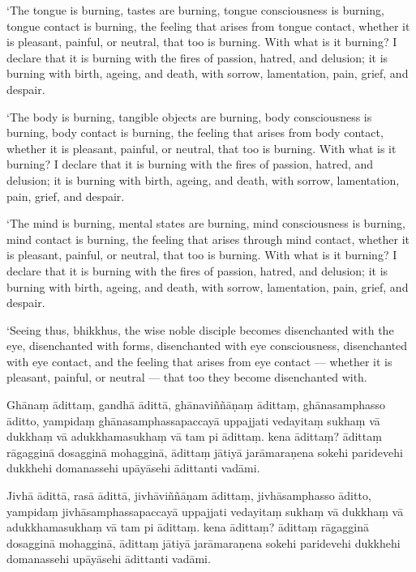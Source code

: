 ‘The tongue is burning, tastes are burning, tongue consciousness is
burning, tongue contact is burning, the feeling that arises from tongue
contact, whether it is pleasant, painful, or neutral, that too is
burning. With what is it burning? I declare that it is burning with the
fires of passion, hatred, and delusion; it is burning with birth,
ageing, and death, with sorrow, lamentation, pain, grief, and despair.

‘The body is burning, tangible objects are burning, body consciousness
is burning, body contact is burning, the feeling that arises from body
contact, whether it is pleasant, painful, or neutral, that too is
burning. With what is it burning? I declare that it is burning with the
fires of passion, hatred, and delusion; it is burning with birth,
ageing, and death, with sorrow, lamentation, pain, grief, and despair.

‘The mind is burning, mental states are burning, mind consciousness is
burning, mind contact is burning, the feeling that arises through mind
contact, whether it is pleasant, painful, or neutral, that too is
burning. With what is it burning? I declare that it is burning with the
fires of passion, hatred, and delusion; it is burning with birth,
ageing, and death, with sorrow, lamentation, pain, grief, and despair.

‘Seeing thus, bhikkhus, the wise noble disciple becomes disenchanted
with the eye, disenchanted with forms, disenchanted with eye
consciousness, disenchanted with eye contact, and the feeling that
arises from eye contact --- whether it is pleasant, painful, or
neutral --- that too they become disenchanted with.

\clearpage

\paliText
\markboth{\paliTitle}{\rightmark}

Ghānaṃ ādittaṃ, gandhā ādittā, ghānaviññāṇaṃ ādittaṃ, ghānasamphasso
āditto, yampidaṃ ghānasamphassapaccayā uppajjati vedayitaṃ sukhaṃ vā
dukkhaṃ vā adukkhamasukhaṃ vā tam pi ādittaṃ. kena ādittaṃ? ādittaṃ
rāgagginā dosagginā mohagginā, ādittaṃ jātiyā jarāmaraṇena sokehi
paridevehi dukkhehi domanassehi upāyāsehi ādittanti vadāmi.

Jivhā ādittā, rasā ādittā, jivhāviññāṇam ādittaṃ, jivhāsamphasso āditto,
yampidaṃ jivhāsamphassapaccayā uppajjati vedayitaṃ sukhaṃ vā dukkhaṃ vā
adukkhamasukhaṃ vā tam pi ādittaṃ. kena ādittaṃ? ādittaṃ rāgagginā
dosagginā mohagginā, ādittaṃ jātiyā jarāmaraṇena sokehi paridevehi
dukkhehi domanassehi upāyāsehi ādittanti vadāmi.

